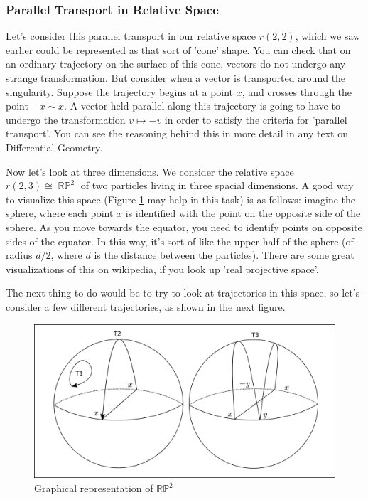 \documentclass{article}
\DeclareMathOperator{\RP}{\mathbb{RP}}
\begin{document}
\subsubsection{Parallel Transport in Relative Space}
Let's consider this parallel transport in our relative space $r(2,2)$, which we saw earlier could be represented as that sort of 'cone' shape. You can check that on an ordinary trajectory on the surface of this cone, vectors do not undergo any strange transformation. But consider when a vector is transported around the singularity. Suppose the trajectory begins at a point $x$, and crosses through the point $-x \sim x$. A vector held parallel along this trajectory is going to have to undergo the transformation $v \mapsto -v$ in order to satisfy the criteria for 'parallel transport'. You can see the reasoning behind this in more detail in any text on Differential Geometry.

Now let's look at three dimensions. We consider the relative space $r(2,3) \cong \RP^2$ of two particles living in three spacial dimensions. A good way to visualize this space (Figure \ref{fig:23} may help in this task) is as follows: imagine the sphere, where each point $x$ is identified with the point on the opposite side of the sphere. As you move towards the equator, you need to identify points on opposite sides of the equator. In this way, it's sort of like the upper half of the sphere (of radius $d/2$, where $d$ is the distance between the particles). There are some great visualizations of this on wikipedia, if you look up 'real projective space'.

The next thing to do would be to try to look at trajectories in this space, so let's consider a few different trajectories, as shown in the next figure.

\begin{figure}[h]
    \centering
    \includegraphics[width=\linewidth]{Figures/trajectories_in_rp2.png}
    \captionsetup{belowskip=-15pt}
    \caption{Graphical representation of $ \mathbb{RP}^2 $}
    \label{fig:23}
\end{figure}
\end{document}
